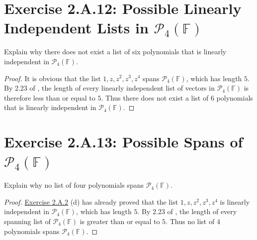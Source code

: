 \section{Exercise 2.A.12: Possible Linearly Independent Lists in $\mathcal{P}_4(\mathbb{F})$}
Explain why there does not exist a list of six polynomials that is linearly independent in $\mathcal{P}_4(\mathbb{F})$.
\begin{proof}
It is obvious that the list $1, z, z^2, z^3, z^4$ spans $\mathcal{P}_4(\mathbb{F})$, which has length $5$. By 2.23 of \cite{axler2014linear}, the length of every linearly independent list of vectors in $\mathcal{P}_4(\mathbb{F})$ is therefore less than or equal to $5$. Thus there does not exist a list of $6$ polynomials that is linearly independent in $\mathcal{P}_4(\mathbb{F})$.
\end{proof}

\section{Exercise 2.A.13: Possible Spans of $\mathcal{P}_4(\mathbb{F})$}
Explain why no list of four polynomials spans $\mathcal{P}_4(\mathbb{F})$.
\begin{proof}
\hyperref[Exercise 2.A.2]{Exercise 2.A.2} (d) has already proved that the list $1, z, z^2, z^3, z^4$ is linearly independent in $\mathcal{P}_4(\mathbb{F})$, which has length $5$. By 2.23 of \cite{axler2014linear}, the length of every spanning list of $\mathcal{P}_4(\mathbb{F})$ is greater than or equal to $5$. Thus no list of $4$ polynomials spans $\mathcal{P}_4(\mathbb{F})$.
\end{proof}

